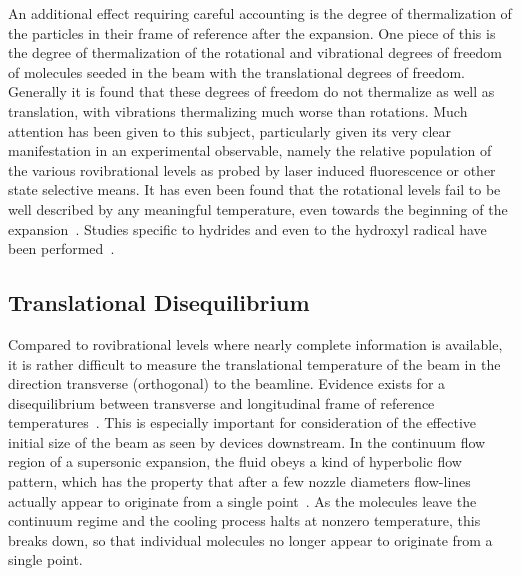 An additional effect requiring careful accounting is the degree of thermalization of the particles in their frame of reference after the expansion.
One piece of this is the degree of thermalization of the rotational and vibrational degrees of freedom of molecules seeded in the beam with the translational degrees of freedom.
Generally it is found that these degrees of freedom do not thermalize as well as translation, with vibrations thermalizing much worse than rotations.
Much attention has been given to this subject, particularly given its very clear manifestation in an experimental observable, namely the relative population of the various rovibrational levels as probed by laser induced fluorescence or other state selective means.
It has even been found that the rotational levels fail to be well described by any meaningful temperature, even towards the beginning of the expansion~\cite{Hulsman2001}.
Studies specific to hydrides and even to the hydroxyl radical have been performed~\cite{Belikov2001}. 

\subsection{Translational Disequilibrium}

Compared to rovibrational levels where nearly complete information is available, it is rather difficult to measure the translational temperature of the beam in the direction transverse (orthogonal) to the beamline. 
Evidence exists for a disequilibrium between transverse and longitudinal frame of reference temperatures~\cite{beijerinck1981,Toennies1977,Miller1988}.
This is especially important for consideration of the effective initial size of the beam as seen by devices downstream.
In the continuum flow region of a supersonic expansion, the fluid obeys a kind of hyperbolic flow pattern, which has the property that after a few nozzle diameters flow-lines actually appear to originate from a single point~\cite{Miller1988}.
As the molecules leave the continuum regime and the cooling process halts at nonzero temperature, this breaks down, so that individual molecules no longer appear to originate from a single point.

